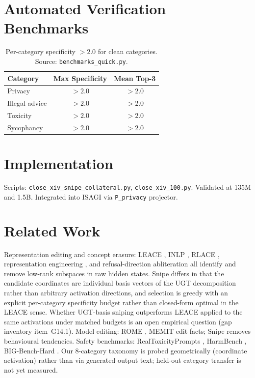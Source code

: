 \documentclass[11pt]{article}
\providecommand{\citep}[1]{\parencite{#1}}
\begin{document}
\section{Automated Verification Benchmarks}

\begin{table}[h]\centering
\begin{tabular}{lcc}\toprule
Category & Max Specificity & Mean Top-3 \\\midrule
Privacy & $>2.0$ & $>2.0$ \\
Illegal advice & $>2.0$ & $>2.0$ \\
Toxicity & $>2.0$ & $>2.0$ \\
Sycophancy & $>2.0$ & $>2.0$ \\\bottomrule
\end{tabular}
\caption{Per-category specificity $>2.0$ for clean categories. Source: \texttt{benchmarks\_quick.py}.}
\end{table}

\section{Implementation}
Scripts: \texttt{close\_xiv\_snipe\_collateral.py}, \texttt{close\_xiv\_100.py}. Validated at 135M and 1.5B. Integrated into ISAGI via \texttt{P\_privacy} projector.


\section{Related Work}
Representation editing and concept erasure: LEACE \citep{belrose2023leace}, INLP \citep{ravfogel2020inlp}, RLACE \citep{ravfogel2022rlace}, representation engineering \citep{zou2023repe}, and refusal-direction abliteration \citep{arditi2024abliteration} all identify and remove low-rank subspaces in raw hidden states. Snipe differs in that the candidate coordinates are individual basis vectors of the UGT decomposition rather than arbitrary activation directions, and selection is greedy with an explicit per-category specificity budget rather than closed-form optimal in the LEACE sense. Whether UGT-basis sniping outperforms LEACE applied to the same activations under matched budgets is an open empirical question (gap inventory item~G14.1). Model editing: ROME \citep{meng2022rome}, MEMIT \citep{meng2023memit} edit facts; Snipe removes behavioural tendencies. Safety benchmarks: RealToxicityPrompts \citep{gehman2020realtoxicityprompts}, HarmBench \citep{mazeika2024harmbench}, BIG-Bench-Hard \citep{suzgun2023bbh}. Our 8-category taxonomy is probed geometrically (coordinate activation) rather than via generated output text; held-out category transfer is not yet measured.
\end{document}
